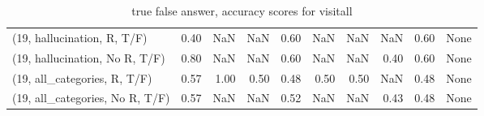 \begin{table*}[h!]
\begin{adjustbox}{width=2\columnwidth,center}
\begin{tabular}{lrrr|rrr|rrr}
(19, hallucination, R, T/F)           &                      0.40 &                   NaN &                       NaN &                          0.60 &                       NaN &                           NaN &                                    NaN &                               0.60 &                                  None \\
(19, hallucination, No R, T/F)        &                      0.80 &                   NaN &                       NaN &                          0.60 &                       NaN &                           NaN &                                   0.40 &                               0.60 &                                  None \\
(19, all\_categories, R, T/F)          &                      0.57 &                  1.00 &                      0.50 &                          0.48 &                      0.50 &                          0.50 &                                    NaN &                               0.48 &                                  None \\
(19, all\_categories, No R, T/F)       &                      0.57 &                   NaN &                       NaN &                          0.52 &                       NaN &                           NaN &                                   0.43 &                               0.48 &                                  None \\


\bottomrule
\end{tabular}
\end{adjustbox}
\caption{true false answer, accuracy scores for visitall}
\end{table*}